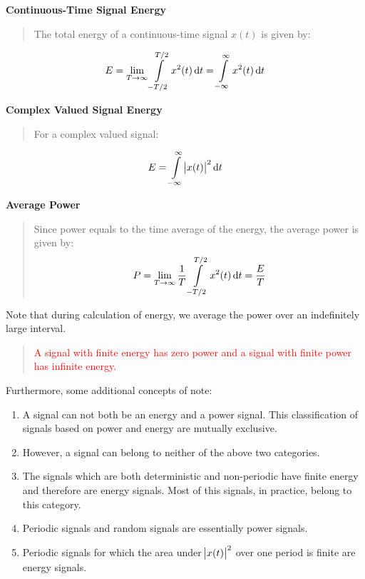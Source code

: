 \documentclass[
  14pt,
  a4paper,
  oneside,
  open=any,
  a4paper,
  14pt]{report}
\begin{document}
\textbf{Continuous-Time Signal Energy}

\begin{quote}
The total energy of a continuous-time signal \(x(t)\) is given by:
\end{quote}

\[
    E = \lim\limits_{T \to \infty}\int\limits_{-T/2}^{T/2} x^2(t) \odif{t} = \int\limits_{-\infty}^{\infty} x^2(t) \odif{t}
\]

\textbf{Complex Valued Signal Energy}

\begin{quote}
For a complex valued signal:
\end{quote}

\[
    E = \int\limits_{-\infty}^{\infty} \abs{x(t)}^2 \odif{t}
\]

\textbf{Average Power}

\begin{quote}
Since power equals to the time average of the energy, the average power
is given by: \[
P = \lim\limits_{T \to \infty} \dfrac{1}{T} \int\limits_{-T/2}^{T/2} x^2(t) \odif{t} = \dfrac{E}{T}
\]
\end{quote}

Note that during calculation of energy, we average the power over an
indefinitely large interval.

\begin{quote}
\textcolor{red}{A signal with finite energy has zero power and a signal
with finite power has infinite energy.}
\end{quote}

Furthermore, some additional concepts of note:

\begin{enumerate}
\def\labelenumi{\alph{enumi}.}
\item
  A signal can not both be an energy and a power signal. This
  classification of signals based on power and energy are mutually
  exclusive.
\item
  However, a signal can belong to neither of the above two categories.
\item
  The signals which are both deterministic and non-periodic have finite
  energy and therefore are energy signals. Most of this signals, in
  practice, belong to this category.
\item
  Periodic signals and random signals are essentially power signals.
\item
  Periodic signals for which the area under \(\abs{x(t)}^2\) over one
  period is finite are energy signals.
\end{enumerate}
\end{document}
